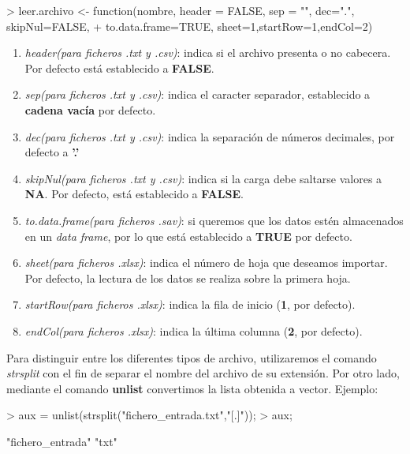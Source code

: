 \documentclass [a4paper] {article}
\begin{document}
\begin{Schunk}
\begin{Sinput}
> leer.archivo <- function(nombre, header = FALSE, sep = "", dec=".", skipNul=FALSE, 
+ to.data.frame=TRUE, sheet=1,startRow=1,endCol=2){}
\end{Sinput}
\end{Schunk}
\begin{enumerate}
	\item \textit{header(para ficheros .txt y .csv)}: indica si el archivo presenta o no cabecera. Por defecto está establecido a \textbf{FALSE}.
	\item \textit{sep(para ficheros .txt y .csv)}: indica el caracter separador, establecido a \textbf{cadena vacía} por defecto.
	\item \textit{dec(para ficheros .txt y .csv)}: indica la separación de números decimales, por defecto a \textbf{'.'}
	\item \textit{skipNul(para ficheros .txt y .csv)}: indica si la carga debe saltarse valores a \textbf{NA}. Por defecto, está establecido a \textbf{FALSE}.
	\item \textit{to.data.frame(para ficheros .sav)}: si queremos que los datos estén almacenados en un \textit{data frame}, por lo que está establecido a \textbf{TRUE} por defecto.
	\item \textit{sheet(para ficheros .xlsx)}: indica el número de hoja que deseamos importar. Por defecto, la lectura de los datos se realiza sobre la primera hoja.
	\item \textit{startRow(para ficheros .xlsx)}: indica la fila de inicio (\textbf{1}, por defecto).
	\item \textit{endCol(para ficheros .xlsx)}: indica la última columna (\textbf{2}, por defecto).
\end{enumerate}

Para distinguir entre los diferentes tipos de archivo, utilizaremos el comando \textit{strsplit} con el fin de 
separar el nombre del archivo de su extensión. Por otro lado, mediante el comando \textbf{unlist} convertimos la lista obtenida a vector.
Ejemplo:
\begin{Schunk}
\begin{Sinput}
> aux = unlist(strsplit("fichero_entrada.txt","[.]"));
> aux;
\end{Sinput}
\begin{Soutput}
[1] "fichero_entrada" "txt"            
\end{Soutput}
\end{Schunk}
\end{document}
